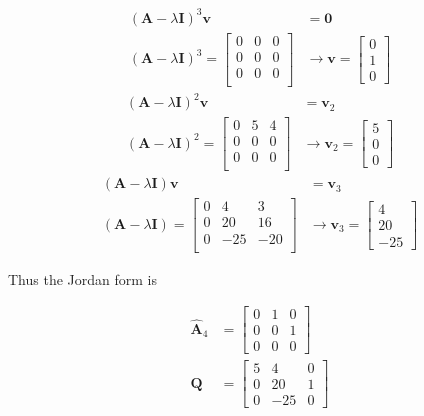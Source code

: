 \begin{itemize}
\begin{align*}
 (\mathbf{A}-\lambda \mathbf{I})^3 \mathbf{v}& = \mathbf{0} \\
 (\mathbf{A}-\lambda \mathbf{I})^3 = \begin{bmatrix}
  0 & 0 & 0\\
  0 & 0 & 0\\
  0 & 0 & 0\\
 \end{bmatrix}
&\rightarrow \mathbf{v}= \begin{bmatrix}
                            0\\1\\0
                           \end{bmatrix}
\end{align*}
\begin{align*}
 (\mathbf{A}-\lambda \mathbf{I})^2 \mathbf{v}& = \mathbf{v}_2 \\
 (\mathbf{A}-\lambda \mathbf{I})^2 = \begin{bmatrix}
  0 & 5 & 4\\
  0 & 0 & 0\\
  0 & 0 & 0\\
 \end{bmatrix}
&\rightarrow \mathbf{v}_2= \begin{bmatrix}
                            5\\0\\0
                           \end{bmatrix}
\end{align*}
\begin{align*}
 (\mathbf{A}-\lambda \mathbf{I}) \mathbf{v}& = \mathbf{v}_3 \\
 (\mathbf{A}-\lambda \mathbf{I}) = \begin{bmatrix}
  0 & 4 & 3\\
  0 & 20 &16\\
  0 & -25 & -20\\
 \end{bmatrix}
&\rightarrow \mathbf{v}_3= \begin{bmatrix}
                            4\\20\\-25
                           \end{bmatrix}
\end{align*}

 Thus the Jordan form is

 \begin{align*}
 \hat {\mathbf{A}}_4 &= \begin{bmatrix}
                       0 & 1 & 0\\ 0&0&1\\0&0&0
                      \end{bmatrix}\\
  \mathbf{Q} &= \begin{bmatrix}
   5 & 4 & 0\\
   0 & 20 & 1\\
   0 & -25 &0
  \end{bmatrix}
 \end{align*}



\end{itemize}
